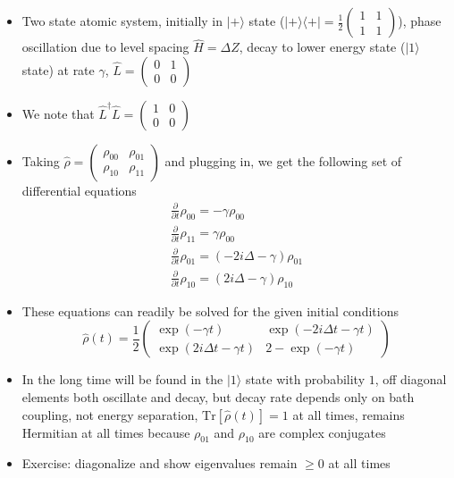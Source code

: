 \documentclass[english]{article}
\newcommand{\ket}[1]{|#1 \rangle}
\newcommand{\ketbra}[2]{\vert #1 \rangle \! \langle #2 \vert}
\begin{document}
\begin{itemize}
\begin{itemize}
\item Two state atomic system, initially in $\ket{+}$ state ($\ketbra{+}{+}=\frac{1}{2}\left(\begin{array}{cc} 1 & 1 \\ 1 & 1 \end{array}\right)$), phase oscillation due to level spacing $\hat{H}=\Delta Z$, decay to lower energy state ($\ket{1}$ state) at rate $\gamma$, $\hat{L}=\left(\begin{array}{cc} 0 & 1 \\ 0 & 0 \end{array}\right)$
\item We note that $\hat{L}^\dagger \hat{L}=\left(\begin{array}{cc} 1 & 0 \\ 0 & 0 \end{array}\right)$
\item Taking $\hat{\rho}=\left(\begin{array}{cc} \rho_{00} & \rho_{01} \\ \rho_{10} & \rho_{11} \end{array}\right)$ and plugging in, we get the following set of differential equations
\begin{align}
\frac{\partial}{\partial t}\rho_{00}=-\gamma \rho_{00}\\
\frac{\partial}{\partial t}\rho_{11}=\gamma \rho_{00}\\
\frac{\partial}{\partial t}\rho_{01}=(-2 i\Delta -\gamma) \rho_{01}\\
\frac{\partial}{\partial t}\rho_{10}=(2 i\Delta -\gamma) \rho_{10}
\end{align}
\item These equations can readily be solved for the given initial conditions
\begin{equation}
\hat{\rho}(t)=\frac{1}{2}\left(\begin{array}{cc} \exp(-\gamma t) & \exp(-2 i\Delta t-\gamma t) \\ \exp(2 i\Delta t-\gamma t) & 2-\exp(-\gamma t) \end{array}\right)
\end{equation}
\item In the long time will be found in the $\ket{1}$ state with probability $1$, off diagonal elements both oscillate and decay, but decay rate depends only on bath coupling, not energy separation, $\mathrm{Tr}[\hat{\rho}(t)]=1$ at all times, remains Hermitian at all times because $\rho_{01}$ and $\rho_{10}$ are complex conjugates
\item Exercise: diagonalize and show eigenvalues remain $\ge 0$ at all times
\end{itemize}
\end{itemize}
\end{document}
